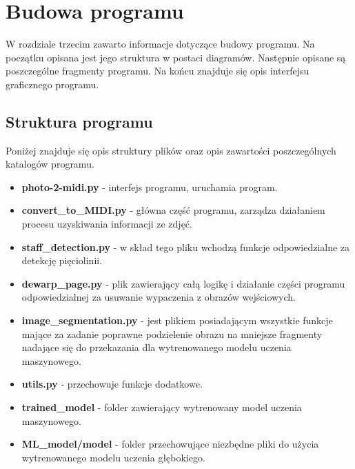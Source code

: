\chapter{Budowa programu}
W rozdziale trzecim zawarto informacje dotyczące budowy programu. Na początku opisana jest jego struktura w postaci diagramów. Następnie opisane są poszczególne fragmenty programu. Na końcu znajduje się opis interfejsu graficznego programu.


\section{Struktura programu}

Poniżej znajduje się opis struktury plików oraz opis zawartości poszczególnych katalogów programu.

\begin{itemize}
	\item \textbf{photo-2-midi.py} - interfejs programu, uruchamia program.
	\item \textbf{convert\_to\_MIDI.py} - główna część programu, zarządza działaniem procesu uzyskiwania informacji ze zdjęć.
	\item \textbf{staff\_detection.py} - w skład tego pliku wchodzą funkcje odpowiedzialne za detekcję pięciolinii.
	\item \textbf{dewarp\_page.py} - plik zawierający całą logikę i działanie części programu odpowiedzialnej za usuwanie wypaczenia z obrazów wejściowych.
	\item \textbf{image\_segmentation.py} - jest plikiem posiadającym wszystkie funkcje mające za zadanie poprawne podzielenie obrazu na mniejsze fragmenty nadające się do przekazania dla wytrenowanego modelu uczenia maszynowego.
	\item \textbf{utils.py} - przechowuje funkcje dodatkowe.
	\item \textbf{trained\_model} - folder zawierający wytrenowany model uczenia maszynowego.
	\item \textbf{ML\_model/model} - folder przechowujące niezbędne pliki do użycia wytrenowanego modelu uczenia głębokiego.
\end{itemize}

